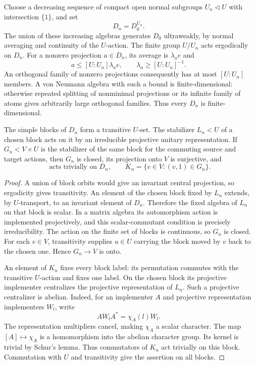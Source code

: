 Choose a decreasing sequence of compact open normal subgroups
$U_n\triangleleft U$ with intersection $\{1\}$, and set
\[
 D_n=D_0^{U_n}.
\]
The union of these increasing algebras generates $D_0$ ultraweakly,
by normal averaging and continuity of the $U$-action.
The finite group $U/U_n$ acts ergodically on $D_n$.
For a nonzero projection $a\in D_n$, its average is $\lambda_a e$ and
\[
 a\leq [U:U_n]\lambda_a e,\qquad \lambda_a\geq [U:U_n]^{-1}.
\]
An orthogonal family of nonzero projections consequently has at
most $[U:U_n]$ members.  A von Neumann algebra with such a bound is
finite-dimensional: otherwise repeated splitting of nonminimal
projections or its infinite family of atoms gives arbitrarily large
orthogonal families.  Thus every $D_n$ is finite-dimensional.

\begin{lemma}
\label{lem:finite-blocks}
The simple blocks of $D_n$ form a transitive $U$-set.  The stabilizer
$L_n<U$ of a chosen block acts on it by an irreducible projective
unitary representation.  If $G_n<V\times U$ is the stabilizer of the
same block for the commuting source and target actions, then $G_n$
is closed, its projection onto $V$ is surjective, and
\begin{equation}
 [K_n,K_n]\text{ acts trivially on }D_n,\qquad
 K_n=\{v\in V:(v,1)\in G_n\}.
 \label{eq:finite-block-commutators}
\end{equation}
\end{lemma}

\begin{proof}
A union of block orbits would give an invariant central projection,
so ergodicity gives transitivity.  An element of the chosen block
fixed by $L_n$ extends, by $U$-transport, to an invariant element of
$D_n$.  Therefore the fixed algebra of $L_n$ on that block is
scalar.  In a matrix algebra its automorphism action is implemented
projectively, and this scalar-commutant condition is precisely
irreducibility.  The action on the finite set of blocks is
continuous, so $G_n$ is closed.  For each $v\in V$, transitivity
supplies $u\in U$ carrying the block moved by $v$ back to the chosen
one.  Hence $G_n\to V$ is onto.

An element of $K_n$ fixes every block label: its permutation commutes
with the transitive $U$-action and fixes one label.  On the chosen
block its projective implementer centralizes the projective
representation of $L_n$.  Such a projective centralizer is abelian.
Indeed, for an implementer $A$ and projective representation
implementers $W_l$, write
\[
 AW_lA^*=\chi_A(l)W_l.
\]
The representation multipliers cancel, making $\chi_A$ a scalar
character.  The map $[A]\mapsto\chi_A$ is a homomorphism into the
abelian character group.  Its kernel is trivial by Schur's lemma.
Thus commutators of $K_n$ act trivially on this block.  Commutation
with $U$ and transitivity give the assertion on all blocks.
\end{proof}

